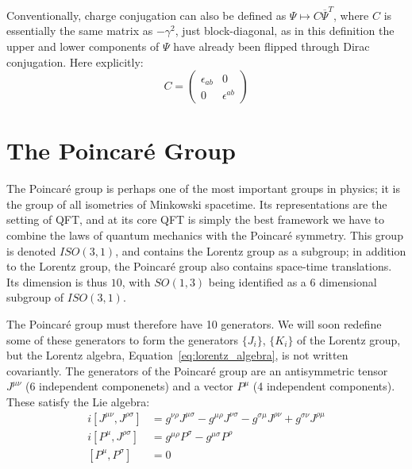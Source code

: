 \documentclass[11pt, oneside]{article}   	%
\theoremstyle{definition}
\begin{document}
Conventionally, charge conjugation can also be defined as $\Psi\mapsto C\overline\Psi^T$, where $C$ is essentially the same matrix as 
$-\gamma^2$, just block-diagonal, as in this definition the upper and lower components of $\Psi$ have already been flipped through 
Dirac conjugation. Here explicitly:
\begin{equation}
	C = \begin{pmatrix} \epsilon_{ab} & 0 \\ 0 & \epsilon^{ab} \end{pmatrix}
\end{equation}

\section{The Poincar\'{e} Group}

The Poincar\'e group is perhaps one of the most important groups in physics; it is the group of all isometries of Minkowski 
spacetime. Its representations are the setting of QFT, and at its core QFT is simply the best framework we have to combine 
the laws of quantum mechanics with the Poincar\'e symmetry. This group is denoted $ISO(3, 1)$, and contains the 
Lorentz group as a subgroup; in addition to the Lorentz group, the Poincar\'e group also contains space-time translations. 
Its dimension is thus $10$, with $SO(1, 3)$ being identified as a 6 dimensional subgroup of $ISO(3, 1)$. 

The Poincar\'e group must therefore have 10 generators. We will soon redefine some of these generators to form 
the generators $\{J_i\}$, $\{K_i\}$ of the Lorentz group, but the Lorentz algebra, Equation~\ref{eq:lorentz_algebra}, 
is not written covariantly. The generators of the Poincar\'e group are an antisymmetric tensor $J^{\mu\nu}$ (6 
independent componenets) and a vector $P^\mu$ (4 independent components). These satisfy the Lie algebra:
\begin{align}
	i[J^{\mu\nu}, J^{\rho\sigma}] &= g^{\nu\rho} J^{\mu\sigma} - g^{\mu\rho} J^{\nu\sigma} - g^{\sigma\mu} J^{\rho\nu} 
	+ g^{\sigma\nu} J^{\rho\mu} \nonumber \\
	i[P^\mu, J^{\rho\sigma}] &= g^{\mu\rho} P^\sigma - g^{\mu\sigma} P^\rho \label{eq:poincare_algebra} \\
	[P^\mu, P^\sigma] &= 0 \nonumber
\end{align}
\end{document}
